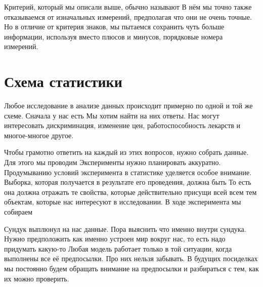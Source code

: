 \documentclass[12pt, a4paper, oneside]{article}
\begin{document}
Критерий, который мы описали выше, обычно называют  В нём мы точно также отказываемся от изначальных измерений, предполагая что они не очень точные. Но в отличие от критерия знаков, мы пытаемся сохранить чуть больше информации, используя вместо плюсов и минусов, порядковые номера измерений.


\section{Схема статистики}

Любое исследование в анализе данных происходит примерно по одной и той же схеме. Сначала у нас есть  Мы хотим найти на них ответы. Нас могут интересовать дискриминация, изменение цен, работоспособность лекарств и многое-многое другое. 

Чтобы грамотно ответить на каждый из этих вопросов, нужно собрать данные. Для этого мы проводим  Эксперименты нужно планировать аккуратно. Продумыванию условий эксперимента в статистике уделяется особое внимание. Выборка, которая получается в результате его проведения, должна быть  То есть она должна отражать те свойства, которые действительно присущи всей  всем тем объектам, которые нас интересуют в исследовании. В ходе эксперимента мы собираем  

Сундук выплюнул на нас данные. Пора выяснить что именно внутри сундука. Нужно предположить как именно устроен мир вокруг нас, то есть надо придумать какую-то  Любая модель работает только в той ситуации, когда выполнены все её предпосылки. Про них нельзя забывать. В будущих посиделках мы постоянно будем обращать внимание на предпосылки и разбираться с тем, как их можно проверить. 

\begin{center}
\end{center}   	
    	
\end{document}
